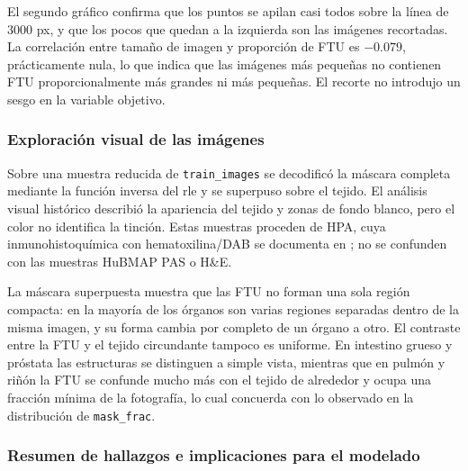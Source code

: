 \documentclass[11pt,letterpaper]{article}
\begin{document}
El segundo gráfico confirma que los puntos se apilan casi todos sobre la línea de 3000 px, y que los
pocos que quedan a la izquierda son las imágenes recortadas. La correlación entre tamaño de imagen y
proporción de FTU es $-0.079$, prácticamente nula, lo que indica que las imágenes más pequeñas no
contienen FTU proporcionalmente más grandes ni más pequeñas. El recorte no introdujo un sesgo en la
variable objetivo.

\subsubsection{Exploración visual de las imágenes}

Sobre una muestra reducida de \texttt{train\_images} se decodificó la máscara completa mediante la
función inversa del rle y se superpuso sobre el tejido. El análisis visual histórico describió la
apariencia del tejido y zonas de fondo blanco, pero el color no identifica la tinción. Estas
muestras proceden de HPA, cuya inmunohistoquímica con hematoxilina/DAB se documenta en
\textcite{jain2023hacking}; no se confunden con las muestras HuBMAP PAS o H\&E.

La máscara superpuesta muestra que las FTU no forman una sola región compacta: en la mayoría de los
órganos son varias regiones separadas dentro de la misma imagen, y su forma cambia por completo de
un órgano a otro. El contraste entre la FTU y el tejido circundante tampoco es uniforme. En intestino
grueso y próstata las estructuras se distinguen a simple vista, mientras que en pulmón y riñón la FTU
se confunde mucho más con el tejido de alrededor y ocupa una fracción mínima de la fotografía, lo
cual concuerda con lo observado en la distribución de \texttt{mask\_frac}.

\subsubsection{Resumen de hallazgos e implicaciones para el modelado}
\end{document}
